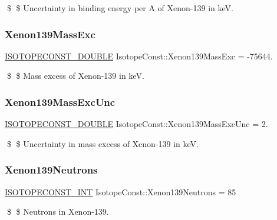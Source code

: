\$ \$ Uncertainty in binding energy per A of Xenon-\/139 in keV. \mbox{\label{group___isotope_const-_xenon-_xe139_gabeedfead610f9d04d680118e061c61dd}} 
\subsubsection{\texorpdfstring{Xenon139\+Mass\+Exc}{Xenon139MassExc}}
{\footnotesize\ttfamily \mbox{\hyperlink{group___isotope_const-_macros_ga8f45a7272ce02c0b4c65c44636ed719a}{I\+S\+O\+T\+O\+P\+E\+C\+O\+N\+S\+T\+\_\+\+D\+O\+U\+B\+LE}} Isotope\+Const\+::\+Xenon139\+Mass\+Exc = -\/75644.}

\$ \$ Mass excess of Xenon-\/139 in keV. \mbox{\label{group___isotope_const-_xenon-_xe139_ga13de3b27a7c722efdf0ce76f8381fdb3}} 
\subsubsection{\texorpdfstring{Xenon139\+Mass\+Exc\+Unc}{Xenon139MassExcUnc}}
{\footnotesize\ttfamily \mbox{\hyperlink{group___isotope_const-_macros_ga8f45a7272ce02c0b4c65c44636ed719a}{I\+S\+O\+T\+O\+P\+E\+C\+O\+N\+S\+T\+\_\+\+D\+O\+U\+B\+LE}} Isotope\+Const\+::\+Xenon139\+Mass\+Exc\+Unc = 2.}

\$ \$ Uncertainty in mass excess of Xenon-\/139 in keV. \mbox{\label{group___isotope_const-_xenon-_xe139_ga1e72e06b659d0cbd6200ac1b02ed89ef}} 
\subsubsection{\texorpdfstring{Xenon139\+Neutrons}{Xenon139Neutrons}}
{\footnotesize\ttfamily \mbox{\hyperlink{group___isotope_const-_macros_ga5f18360b3e99483a35c32d789e62621c}{I\+S\+O\+T\+O\+P\+E\+C\+O\+N\+S\+T\+\_\+\+I\+NT}} Isotope\+Const\+::\+Xenon139\+Neutrons = 85}

\$ \$ Neutrons in Xenon-\/139. \mbox{\label{group___isotope_const-_xenon-_xe139_gaf6fbb5fceb479fac50c0b783fe3cd6c3}} 
